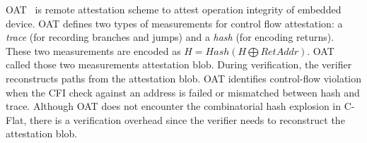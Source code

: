 OAT~\cite{sunOATAttestingOperation2020} is remote attestation scheme to attest
operation integrity of embedded device. OAT defines two types of measurements
for control flow attestation: a \emph{trace} (for recording branches and jumps)
and a \emph{hash} (for encoding returns). These two measurements are encoded as
$H = Hash(H \bigoplus RetAddr)$. OAT called those two measurements attestation
blob. During verification, the verifier reconstructs paths from the attestation
blob. OAT identifies control-flow violation when the CFI check against an
address is failed or mismatched between hash and trace.  Although OAT does not
encounter the combinatorial hash explosion in C-Flat, there is a verification
overhead since the verifier needs to reconstruct the attestation blob. 
